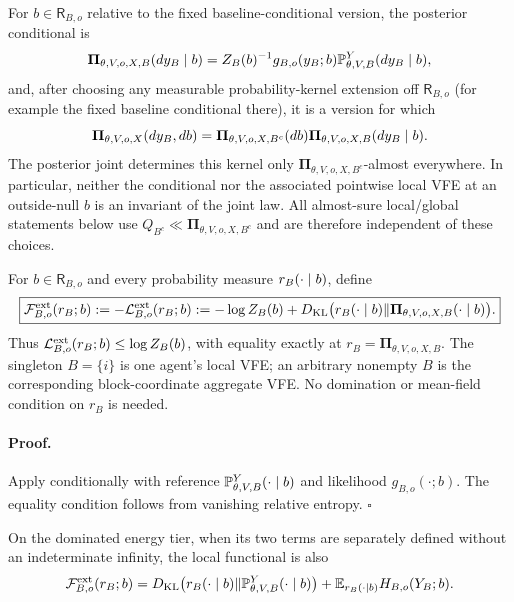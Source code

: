 For $b\in\mathsf R_{B,o}$ relative to the fixed baseline-conditional version,
the posterior conditional is
\begin{equation}
\boldsymbol\Pi_{\theta,V,o,X,B}(dy_B\mid b)
=Z_B(b)^{-1}g_{B,o}(y_B;b)
\mathbb P_{\theta,V,B}^{Y}(dy_B\mid b),
\label{eq:obs-local-posterior}
\end{equation}
and, after choosing any measurable probability-kernel extension off
$\mathsf R_{B,o}$ (for example the fixed baseline conditional there), it is a
version for which
\begin{equation}
\boldsymbol\Pi_{\theta,V,o,X}(dy_B,db)
=\boldsymbol\Pi_{\theta,V,o,X,B^c}(db)
\boldsymbol\Pi_{\theta,V,o,X,B}(dy_B\mid b).
\label{eq:obs-posterior-block-disintegration}
\end{equation}
The posterior joint determines this kernel only
\(\boldsymbol\Pi_{\theta,V,o,X,B^c}\)-almost everywhere. In particular, neither the conditional nor
the associated pointwise local VFE at an outside-null $b$ is an invariant of
the joint law.  All almost-sure local/global statements below use
\(Q_{B^c}\ll\boldsymbol\Pi_{\theta,V,o,X,B^c}\) and are therefore independent of these choices.

For $b\in\mathsf R_{B,o}$ and every probability measure $r_B(\cdot\mid b)$,
define
\begin{equation}
\boxed{
\mathcal F_{B,o}^{\rm ext}(r_B;b)
:=-\mathcal L_{B,o}^{\rm ext}(r_B;b)
:=-\log Z_B(b)
+D_{\mathrm{KL}}\bigl(
r_B(\cdot\mid b)
\Vert\boldsymbol\Pi_{\theta,V,o,X,B}(\cdot\mid b)
\bigr).}
\label{eq:obs-local-vfe}
\end{equation}
Thus $\mathcal L_{B,o}^{\rm ext}(r_B;b)\leq\log Z_B(b)$, with equality
exactly at \(r_B=\boldsymbol\Pi_{\theta,V,o,X,B}\). The singleton $B=\{i\}$ is one agent's local VFE;
an arbitrary nonempty $B$ is the corresponding block-coordinate aggregate VFE.
No domination or mean-field condition on $r_B$ is needed.

\paragraph{Proof.}
Apply  conditionally with reference
\(\mathbb P_{\theta,V,B}^{Y}(\cdot\mid b)\) and likelihood \(g_{B,o}(\cdot;b)\). The equality
condition follows from vanishing relative entropy.  $\square$

On the dominated energy tier, when its two terms are separately defined
without an indeterminate infinity, the local functional is also
\begin{equation}
\mathcal F_{B,o}^{\rm ext}(r_B;b)
=D_{\mathrm{KL}}\bigl(
r_B(\cdot\mid b)
\Vert\mathbb P_{\theta,V,B}^{Y}(\cdot\mid b)
\bigr)
+\mathbb E_{r_B(\cdot\mid b)}H_{B,o}(Y_B;b).
\label{eq:obs-local-energy-form}
\end{equation}

